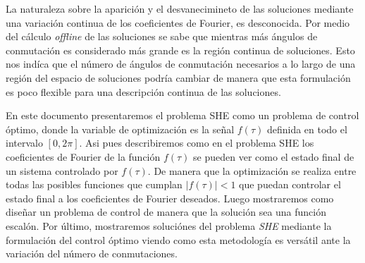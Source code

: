%
La naturaleza sobre la aparición y el desvanecimineto de las soluciones mediante una  variación continua de los coeficientes de Fourier, es desconocida. Por medio del cálculo \emph{offline} de las soluciones se sabe que mientras más ángulos de conmutación es considerado más grande es la región continua de soluciones.
%
Esto nos indíca que el número de ángulos de conmutación necesarios a lo largo de una región del espacio de soluciones podría cambiar de manera que esta formulación es poco flexible para una descripción continua de las soluciones.
\newline

%
En este documento presentaremos el problema SHE como un problema de control óptimo, donde la variable de optimización es la señal $f(\tau)$ definida en todo el intervalo $[0,2\pi]$.
%
Asi pues describiremos como en el problema SHE los coeficientes de Fourier de la función $f(\tau)$ se pueden ver como el estado final de un sistema controlado por $f(\tau)$. 
%
De manera que la optimización se realiza entre todas las posibles funciones que cumplan $|f(\tau)|<1$ que puedan controlar el estado final a los coeficientes de Fourier deseados.  Luego mostraremos como diseñar un problema de control de manera que la solución sea una función escalón. Por último, mostraremos soluciónes del problema \emph{SHE} mediante la formulación del control óptimo viendo como esta metodología es versátil ante la variación del número de conmutaciones.
%

